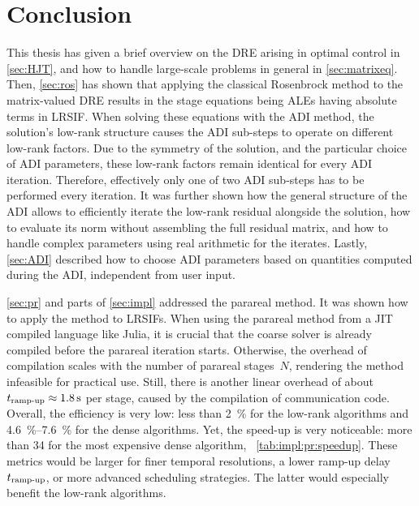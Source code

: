 \chapter{Conclusion}
\label{sec:conclusion}


This thesis has given a brief overview on the \ac{DRE} arising in optimal control in \autoref{sec:HJT},
and how to handle large-scale problems in general in \autoref{sec:matrixeq}.
Then, \autoref{sec:ros} has shown that
applying the classical Rosenbrock method to the matrix-valued \ac{DRE}
results in the stage equations being \acp{ALE}
having absolute terms in \ac{LRSIF}.
When solving these equations with the \ac{ADI} method,
the solution's low-rank structure causes the \ac{ADI} sub-steps to operate on different low-rank factors.
Due to the symmetry of the solution,
and the particular choice of \ac{ADI} parameters,
these low-rank factors remain identical for every \ac{ADI} iteration.
Therefore, effectively only one of two \ac{ADI} sub-steps has to be performed every iteration.
It was further shown how the general structure of the \ac{ADI} allows to efficiently iterate the low-rank residual alongside the solution,
how to evaluate its norm without assembling the full residual matrix,
and how to handle complex parameters using real arithmetic for the iterates.
Lastly, \autoref{sec:ADI} described how to choose \ac{ADI} parameters based on quantities computed during the \ac{ADI},
\ie independent from user input.

\autoref{sec:pr} and parts of \autoref{sec:impl} addressed the parareal method.
It was shown how to apply the method to \acp{LRSIF}.
When using the parareal method from a \ac{JIT} compiled language like Julia,
it is crucial that the coarse solver is already compiled before the parareal iteration starts.
Otherwise, the overhead of compilation scales with the number of parareal stages~$N$,
rendering the method infeasible for practical use.
Still, there is another linear overhead of about $t_\text{ramp-up} \approx \SI{1.8}{\second}$ per stage,
caused by the compilation of communication code.
Overall, the efficiency is very low:
less than \SI{2}{\percent} for the low-rank algorithms and
\SIrange{4.6}{7.6}{\percent} for the dense algorithms.
Yet, the speed-up is very noticeable:
\eg more than \num{34} for the most expensive dense algorithm,
\cf~\autoref{tab:impl:pr:speedup}.
These metrics would be larger for finer temporal resolutions,
a lower ramp-up delay~$t_\text{ramp-up}$,
or more advanced scheduling strategies.
The latter would especially benefit the low-rank algorithms.


